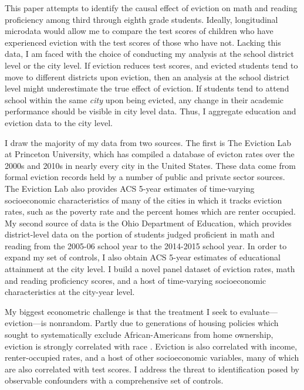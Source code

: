\documentclass[12pt]{article}
\begin{document}
This paper attempts to identify the causal effect of eviction on math and reading proficiency among third through eighth grade students. Ideally, longitudinal microdata would allow me to compare the test scores of children who have experienced eviction with the test scores of those who have not. Lacking this data, I am faced with the choice of conducting my analysis at the school district level or the city level. If eviction reduces test scores, and evicted students tend to move to different districts upon eviction, then an analysis at the school district level might underestimate the true effect of eviction. If students tend to attend school within the same \textit{city} upon being evicted, any change in their academic performance should be visible in city level data. Thus, I aggregate education and eviction data to the city level.

I draw the majority of my data from two sources. The first is The Eviction Lab at Princeton University, which has compiled a database of evicton rates over the 2000s and 2010s in nearly every city in the United States\citep{desmond_eviction_2018}. These data come from formal eviction records held by a number of public and private sector sources. The Eviction Lab also provides ACS 5-year estimates of time-varying socioeconomic characteristics of many of the cities in which it tracks eviction rates, such as the poverty rate and the percent homes which are renter occupied. My second source of data is the Ohio Department of Education, which provides district-level data on the portion of students judged proficient in math and reading from the 2005-06 school year to the 2014-2015 school year. In order to expand my set of controls, I also obtain ACS 5-year estimates of educational attainment at the city level. I build a novel panel dataset of eviction rates, math and reading proficiency scores, and a host of time-varying socioeconomic characteristics at the city-year level.

My biggest econometric challenge is that the treatment I seek to evaluate—eviction—is nonrandom. Partly due to generations of housing policies which sought to systematically exclude African-Americans from home ownership, eviction is strongly correlated with race \citep{rothstein_color_2017}. Eviction is also correlated with income, renter-occupied rates, and a host of other socioeconomic variables, many of which are also correlated with test scores. I address the threat to identification posed by observable confounders with a comprehensive set of controls.
\end{document}

